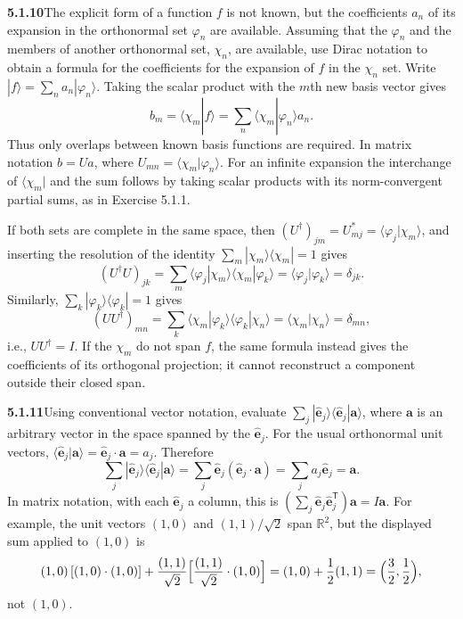 \par\bigskip
\noindent\textbf{5.1.10}\quad The explicit form of a function $f$ is not
known, but the coefficients $a_{n}$ of its expansion in the orthonormal set
$\varphi_{n}$ are available. Assuming that the $\varphi_{n}$ and the members
of another orthonormal set, $\chi_{n}$, are available, use Dirac notation to
obtain a formula for the coefficients for the expansion of $f$ in the
$\chi_{n}$ set.
\solution
Write $|f\rangle=\sum_n a_n|\varphi_n\rangle$. Taking the scalar product
with the $m$th new basis vector gives
\[
\boxed{b_m=\langle\chi_m|f\rangle
=\sum_n\langle\chi_m|\varphi_n\rangle a_n}.
\]
Thus only overlaps between known basis functions are required. In matrix
notation $b=Ua$, where $U_{mn}=\langle\chi_m|\varphi_n\rangle$.
For an infinite expansion the interchange of $\langle\chi_m|$ and the sum
follows by taking scalar products with its norm-convergent partial sums,
as in Exercise 5.1.1.

If both sets are complete in the same space, then
$(U^\dagger)_{jm}=U_{mj}^*=\langle\varphi_j|\chi_m\rangle$, and inserting
the resolution of the identity $\sum_m|\chi_m\rangle\langle\chi_m|=1$ gives
\[
(U^\dagger U)_{jk}
=\sum_m\langle\varphi_j|\chi_m\rangle
           \langle\chi_m|\varphi_k\rangle
=\langle\varphi_j|\varphi_k\rangle=\delta_{jk}.
\]
Similarly, $\sum_k|\varphi_k\rangle\langle\varphi_k|=1$ gives
\[
(UU^\dagger)_{mn}
=\sum_k\langle\chi_m|\varphi_k\rangle
           \langle\varphi_k|\chi_n\rangle
=\langle\chi_m|\chi_n\rangle=\delta_{mn},
\]
i.e., $UU^\dagger=I$. If the $\chi_m$ do not span $f$, the same
formula instead gives the coefficients of its orthogonal projection;
it cannot reconstruct a component outside their closed span.

\par\bigskip
\noindent\textbf{5.1.11}\quad Using conventional vector notation, evaluate
$\sum_{j}|\hat{\mathbf{e}}_{j}\rangle\langle\hat{\mathbf{e}}_{j}|
\mathbf{a}\rangle$, where $\mathbf{a}$ is an arbitrary vector in the space
spanned by the  $\hat{\mathbf{e}}_{j}$.
\solution
For the usual orthonormal unit vectors,
$\langle\hat{\mathbf e}_j|\mathbf a\rangle
=\hat{\mathbf e}_j\cdot\mathbf a=a_j$. Therefore
\[
\boxed{\sum_j|\hat{\mathbf e}_j\rangle
 \langle\hat{\mathbf e}_j|\mathbf a\rangle
=\sum_j\hat{\mathbf e}_j(\hat{\mathbf e}_j\cdot\mathbf a)
=\sum_j a_j\hat{\mathbf e}_j=\mathbf a}.
\]
In matrix notation, with each $\hat{\mathbf e}_j$ a column, this is
$(\sum_j\hat{\mathbf e}_j\hat{\mathbf e}_j^{\mathsf T})\mathbf a=I\mathbf a$.
 For example, the unit vectors $(1,0)$ and
$(1,1)/\sqrt2$ span $\mathbb R^2$, but the displayed sum applied to
$(1,0)$ is
\[
(1,0)\,[(1,0)\cdot(1,0)]
+\frac{(1,1)}{\sqrt2}\Bigl[\frac{(1,1)}{\sqrt2}\cdot(1,0)\Bigr]
=(1,0)+\frac12(1,1)=\Bigl(\frac32,\frac12\Bigr),
\]
not $(1,0)$.

